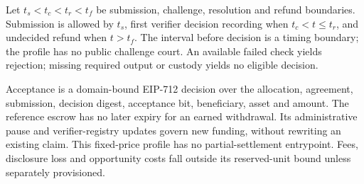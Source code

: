 Let $t_s<t_c<t_r<t_f$ be submission, challenge, resolution and refund boundaries.
Submission is allowed by $t_s$, first verifier decision recording when
$t_c<t\leq t_r$, and undecided refund when $t>t_f$. The interval before decision
is a timing boundary; the profile has no public challenge court.
An available failed check yields rejection; missing required output or custody
yields no eligible decision.

Acceptance is a domain-bound EIP-712 decision over the allocation, agreement,
submission, decision digest, acceptance bit, beneficiary, asset and amount.
The reference escrow has no later expiry for an earned withdrawal. Its
administrative pause and verifier-registry updates govern new funding, without
rewriting an existing claim. This fixed-price profile has no partial-settlement
entrypoint. Fees, disclosure loss and opportunity costs fall outside its
reserved-unit bound unless separately provisioned.
